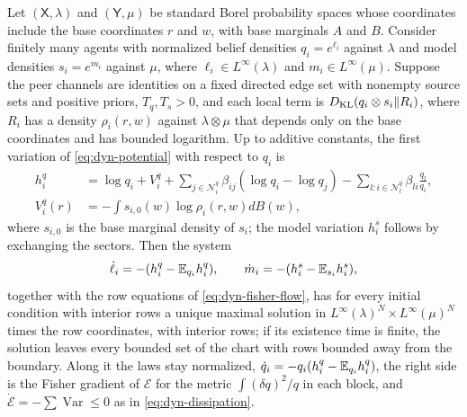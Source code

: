 Let $(\mathsf X,\lambda)$ and $(\mathsf Y,\mu)$ be standard Borel probability spaces whose coordinates include the base coordinates $r$ and $w$, with base marginals $A$ and $B$. Consider finitely many agents with normalized belief densities $q_i=e^{\ell_i}$ against $\lambda$ and model densities $s_i=e^{m_i}$ against $\mu$, where $\ell_i\in L^\infty(\lambda)$ and $m_i\in L^\infty(\mu)$. Suppose the peer channels are identities on a fixed directed edge set with nonempty source sets and positive priors, $T_q,T_s>0$, and each local term is $D_{\mathrm{KL}}(q_i\otimes s_i\Vert R_i)$, where $R_i$ has a density $\rho_i(r,w)$ against $\lambda\otimes\mu$ that depends only on the base coordinates and has bounded logarithm. Up to additive constants, the first variation of \cref{eq:dyn-potential} with respect to $q_i$ is
\begin{equation}
 \begin{aligned}
 h_i^q&=\log q_i+V_i^q
 +\sum_{j\in\mathcal N_i^q}\beta_{ij}(\log q_i-\log q_j)
 -\sum_{l:i\in\mathcal N_l^q}\beta_{li}\frac{q_l}{q_i},\\
 V_i^q(r)&=-\int s_{i,0}(w)\log\rho_i(r,w) dB(w),
 \end{aligned}
 \label{eq:boundary-fine-force}
\end{equation}
where $s_{i,0}$ is the base marginal density of $s_i$; the model variation $h_i^s$ follows by exchanging the sectors. Then the system
\begin{equation}
 \dot\ell_i=-(h_i^q-\mathbb E_{q_i}h_i^q),\qquad
 \dot m_i=-(h_i^s-\mathbb E_{s_i}h_i^s),
 \label{eq:boundary-fine-flow}
\end{equation}
together with the row equations of \cref{eq:dyn-fisher-flow}, has for every initial condition with interior rows a unique maximal solution in $L^\infty(\lambda)^N\times L^\infty(\mu)^N$ times the row coordinates, with interior rows; if its existence time is finite, the solution leaves every bounded set of the chart with rows bounded away from the boundary. Along it the laws stay normalized, $\dot q_i=-q_i(h_i^q-\mathbb E_{q_i}h_i^q)$, the right side is the Fisher gradient of $\mathcal E$ for the metric $\int(\delta q)^2/q$ in each block, and $\dot{\mathcal E}=-\sum\operatorname{Var}\le0$ as in \cref{eq:dyn-dissipation}.

